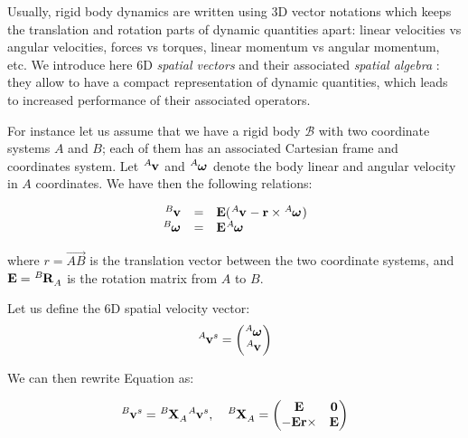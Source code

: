Usually, rigid body dynamics are written using 3D vector notations
which keeps the translation and rotation parts of dynamic quantities
apart: linear velocities vs angular velocities, forces vs torques,
linear momentum vs angular momentum, etc. We introduce here 6D
\emph{spatial vectors} and their associated \emph{spatial algebra}
\cite{feat08}: they allow to have a compact representation of dynamic
quantities, which leads to increased performance of their associated
operators.

For instance let us assume that we have a rigid body $\mathcal{B}$
with two coordinate systems $A$ and $B$; each of them has an
associated Cartesian frame and coordinates system. Let
$\tensor*[^A]{\mathbf{v}}{}$ and $\tensor*[^A]{\boldsymbol{\omega}}{}$
denote the body linear and angular velocity in $A$ coordinates. We
have then the following relations:

\begin{equation}
\label{eq:chap3-transf-3d-vectors}
\begin{array}{rcl}
  \tensor*[^B]{\mathbf{v}}{} &=&
  \mathbf{E}(\tensor*[^A]{\mathbf{v}}{} -
  \mathbf{r}\times\tensor*[^A]{\boldsymbol{\omega}}{})\\%
  \tensor*[^B]{\boldsymbol{\omega}}{} &=&
  \mathbf{E}\tensor*[^A]{\boldsymbol{\omega}}{}
\end{array}
\end{equation}

where $r=\overset{\longrightarrow}{AB}$ is the translation vector
between the two coordinate systems, and $\mathbf{E} =
\tensor*[^B]{\mathbf{R}}{_A}$ is the rotation matrix from $A$ to $B$.

Let us define the 6D spatial velocity vector:
\begin{equation}
  \tensor*[^A]{\mathbf{v}}{^s}=
  \left(\begin{matrix}
    \tensor*[^A]{\boldsymbol{\omega}}{}\\
    \tensor*[^A]{\mathbf{v}}{}
  \end{matrix}\right)
\end{equation}

We can then rewrite Equation  as:

\begin{equation}
  \tensor*[^B]{\mathbf{v}}{^s}=
  \tensor*[^B]{\mathbf{X}}{_A}
  \tensor*[^A]{\mathbf{v}}{^s}
  ,\quad
  \tensor*[^B]{\mathbf{X}}{_A}=
    \left(\begin{matrix}
    \mathbf{E} & \mathbf{0} \\
    -\mathbf{E}\mathbf{r}\times & \mathbf{E}
  \end{matrix}\right)
\end{equation}

